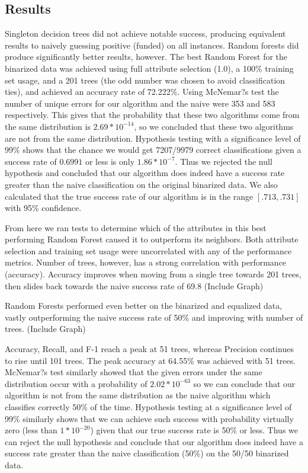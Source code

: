 \documentclass{article}
\begin{document}
\subsection{Results}
Singleton decision trees did not achieve notable success, producing equivalent results to naively guessing positive (funded) on all instances. Random forests did produce significantly better results, however. The best Random Forest for the binarized data was achieved using full attribute selection (1.0), a 100\% training set usage, and a 201 trees (the odd number was chosen to avoid classification ties), and achieved an accuracy rate of 72.222\%. Using McNemar?s test the number of unique errors for our algorithm and the naive were 353 and 583 respectively. This gives that the probability that these two algorithms come from the same distribution is $2.69*10^{-14}$, so we concluded that these two algorithms are not from the same distribution. Hypothesis testing with a significance level of 99\% shows that the chance we would get 7207/9979 correct classifications given a success rate of $0.6991$ or less is only $1.86*10^{-7}$. Thus we rejected the null hypothesis and concluded that our algorithm does indeed have a success rate greater than the naive classification on the original binarized data. We also calculated that the true success rate of our algorithm is in the range $[.713, .731]$ with 95\% confidence.

From here we ran tests to determine which of the attributes in this best performing Random Forest caused it to outperform its neighbors. Both attribute selection and training set usage were uncorrelated with any of the performance metrics. Number of trees, however, has a strong correlation with performance (accuracy). Accuracy improves when moving from a single tree towards 201 trees, then slides back towards the naive success rate of 69.8%
(Include Graph)

Random Forests performed even better on the binarized and equalized data, vastly outperforming the naive success rate of 50\% and improving with number of trees. 
(Include Graph)

Accuracy, Recall, and F-1 reach a peak at 51 trees, whereas Precision continues to rise until 101 trees. The peak accuracy at 64.55\% was achieved with 51 trees. McNemar?s test similarly showed that the given errors under the same distribution occur with a probability of $2.02*10^{-63}$ so we can conclude that our algorithm is not from the same distribution as the naive algorithm which classifies correctly 50\% of the time. Hypothesis testing at a significance level of 99\% similarly shows that we can achieve such success with probability virtually zero (less than $1*10^{-20}$) given that our true success rate is 50\% or less. Thus we can reject the null hypothesis and conclude that our algorithm does indeed have a success rate greater than the naive classification (50\%) on the 50/50 binarized data.
\end{document}
